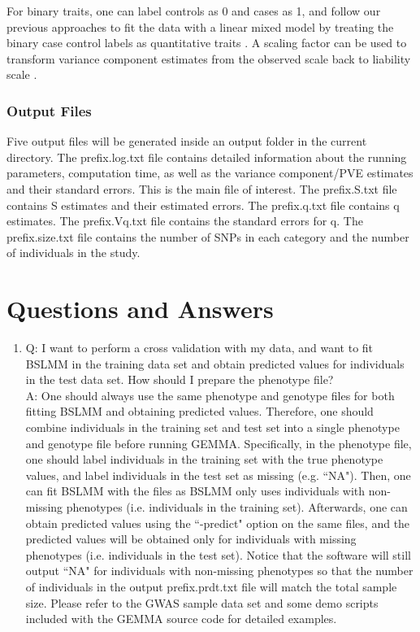 \documentclass[11pt]{article}
\begin{document}
For binary traits, one can label controls as 0 and cases as 1, and
follow our previous approaches to fit the data with a linear mixed
model by treating the binary case control labels as quantitative
traits \cite{Zhou:2013}. A scaling factor can be used to transform
variance component estimates from the observed scale back to liability
scale \cite{Zhou:2013}.

\subsubsection{Output Files}

Five output files will be generated inside an output folder in the
current directory. The prefix.log.txt file contains detailed
information about the running parameters, computation time, as well as
the variance component/PVE estimates and their standard errors. This
is the main file of interest. The prefix.S.txt file contains S
estimates and their estimated errors. The prefix.q.txt file contains q
estimates. The prefix.Vq.txt file contains the standard errors for
q. The prefix.size.txt file contains the number of SNPs in each
category and the number of individuals in the study.

\clearpage
\newpage

\section{Questions and Answers}

\begin{enumerate}

\item Q: I want to perform a cross validation with my data, and want
  to fit BSLMM in the training data set and obtain predicted values
  for individuals in the test data set. How should I prepare the
  phenotype file? \\
A: One should always use the same phenotype and genotype files for
both fitting BSLMM and obtaining predicted values. Therefore, one
should combine individuals in the training set and test set into a
single phenotype and genotype file before running GEMMA. Specifically,
in the phenotype file, one should label individuals in the training
set with the true phenotype values, and label individuals in the test
set as missing (e.g. ``NA"). Then, one can fit BSLMM with the files as
BSLMM only uses individuals with non-missing phenotypes
(i.e. individuals in the training set). Afterwards, one can obtain
predicted values using the ``-predict" option on the same files, and
the predicted values will be obtained only for individuals with
missing phenotypes (i.e. individuals in the test set). Notice that the
software will still output ``NA" for individuals with non-missing
phenotypes so that the number of individuals in the output
prefix.prdt.txt file will match the total sample size. Please refer to
the GWAS sample data set and some demo scripts included with the GEMMA
source code for detailed examples.

\end{enumerate}
\end{document}
